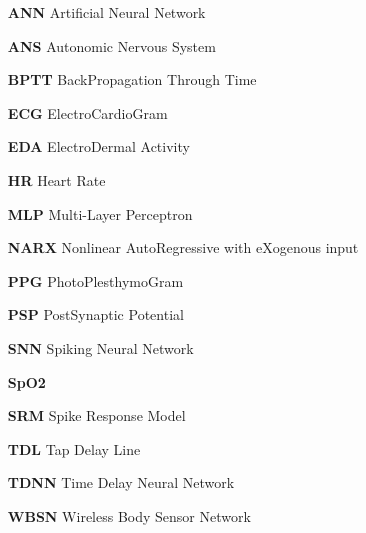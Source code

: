 
\begin{itemize} 

\item[\textbf{ANN}] Artificial Neural Network
\item[\textbf{ANS}] Autonomic Nervous System
\item[\textbf{BPTT}] BackPropagation Through Time
\item[\textbf{ECG}] ElectroCardioGram
\item[\textbf{EDA}] ElectroDermal Activity
\item[\textbf{HR}] Heart Rate
\item[\textbf{MLP}] Multi-Layer Perceptron
\item[\textbf{NARX}] Nonlinear AutoRegressive with eXogenous input
\item[\textbf{PPG}] PhotoPlesthymoGram
\item[\textbf{PSP}] PostSynaptic Potential
\item[\textbf{SNN}] Spiking Neural Network
\item[\textbf{SpO2}] 
\item[\textbf{SRM}] Spike Response Model
\item[\textbf{TDL}] Tap Delay Line
\item[\textbf{TDNN}] Time Delay Neural Network
\item[\textbf{WBSN}] Wireless Body Sensor Network

\end{itemize} 

